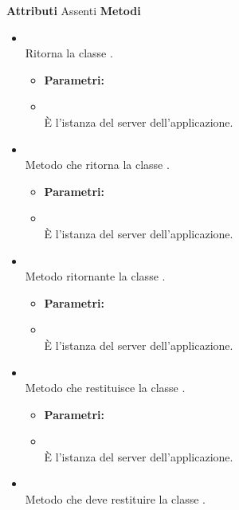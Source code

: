 \textbf{Attributi}
Assenti
\textbf{Metodi}
\begin{itemize}
\item[] \textbf{} \\ Ritorna la classe .
\begin{itemize}\addtolength{\itemsep}{-0.5\baselineskip}
\item[] \textbf{Parametri:}
\item[]  \\ È l'istanza del server dell'applicazione.
\end{itemize}
\item[] \textbf{} \\ Metodo che ritorna la classe .
\begin{itemize}\addtolength{\itemsep}{-0.5\baselineskip}
\item[] \textbf{Parametri:}
\item[]  \\ È l'istanza del server dell'applicazione.
\end{itemize}
\item[] \textbf{} \\ Metodo ritornante la classe .
\begin{itemize}\addtolength{\itemsep}{-0.5\baselineskip}
\item[] \textbf{Parametri:}
\item[]  \\ È l'istanza del server dell'applicazione.
\end{itemize}
\item[] \textbf{} \\ Metodo che restituisce la classe .
\begin{itemize}\addtolength{\itemsep}{-0.5\baselineskip}
\item[] \textbf{Parametri:}
\item[]  \\ È l'istanza del server dell'applicazione.
\end{itemize}
\item[] \textbf{} \\ Metodo che deve restituire la classe .
\begin{itemize}\addtolength{\itemsep}{-0.5\baselineskip}

\end{itemize}
\end{itemize}

